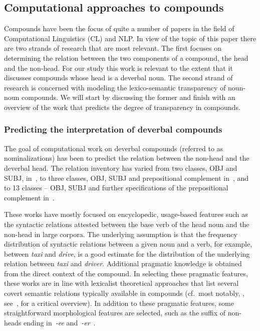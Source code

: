 \documentclass[output=paper]{langsci/langscibook}
\begin{document}
\subsection{Computational approaches to compounds}\label{sec:NLP:lit}
Compounds have been the focus of quite a number of papers in the field of Computational Linguistics (CL) and NLP. In view of the topic of this paper there are two strands of research that are most relevant. The first  focuses on determining the relation between the two components of a compound, the head and the non-head. 
For our study this work is relevant to the extent that it discusses compounds whose head is a deverbal noun.  
The second strand of research is concerned with modeling the  {lexico-semantic transparency} of noun-noun compounds. We will start by discussing the former and finish with an overview of the work that predicts the degree of  {transparency} in compounds.

\subsubsection{Predicting the interpretation of  {deverbal} compounds}\label{sec:NLP:lit:predictions}
The goal of computational work on deverbal compounds (referred to as nominalizations) has been to predict the relation between the non-head and the deverbal head. The relation inventory  
has varied from two classes, OBJ and SUBJ, in~\cite{lapata:02}, to three classes, OBJ, SUBJ and prepositional complement in~\cite{NicholsonBaldwin:06}, and to 13 classes -- OBJ, SUBJ and further specifications of the prepositional complement in~\cite{grover:lapata:lascarides:05}. 

These works have mostly focused on encyclopedic, usage-based features such as the syntactic relations attested between the base verb of the head noun 
and the non-head in large corpora. The underlying assumption is that the frequency distribution of syntactic relations between a given noun and a verb, for example, between \textit{taxi} and \textit{drive}, is a good estimate for the distribution of the underlying relation between \textit{taxi} and \textit{driver}. Additional pragmatic knowledge is obtained  from the direct context of the compound.
In selecting these pragmatic features, these works are in line with lexicalist theoretical approaches that list several covert semantic relations typically available in compounds (cf.\ most notably, \cite{levi:78}, see~\cite{fokkens:07}, for a critical overview). In addition to these pragmatic features, some 
straightforward morphological features are selected, such as the suffix of non-heads ending in~\textit{-ee} and~\textit{-er}~\citep{lapata:02}.
\end{document}
